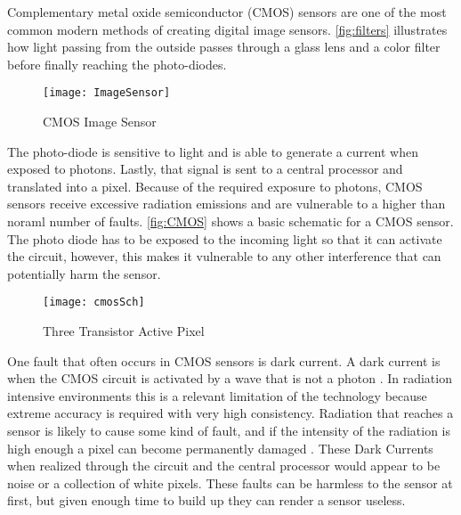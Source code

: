 \par Complementary metal oxide semiconductor (CMOS) sensors are one of the most common modern methods of creating digital image sensors. \autoref{fig:filters} illustrates how light passing from the outside passes through a glass lens and a color filter before finally reaching the photo-diodes.
\begin{figure}[H]
    \texttt{[image: ImageSensor]}
    \caption{CMOS Image Sensor\cite{Tokyo_Electron_Committee}}
    \label{fig:filters}
\end{figure}
\par The photo-diode is sensitive to light and is able to generate a current when exposed to photons. Lastly, that signal is sent to a central processor and translated into a pixel\cite{Tokyo_Electron_Committee}. Because of the required exposure to photons, CMOS sensors receive excessive radiation emissions and are vulnerable to a higher than noraml number of faults. \autoref{fig:CMOS} shows a basic schematic for a CMOS sensor. The photo diode has to be exposed to the incoming light so that it can activate the circuit, however, this makes it vulnerable to any other interference that can potentially harm the sensor. 
\begin{figure}[H]
    \texttt{[image: cmosSch]}
    \caption{Three Transistor Active Pixel}
    \label{fig:CMOS}
\end{figure}
\par One fault that often occurs in CMOS sensors is dark current. A dark current is when the CMOS circuit is activated by a wave that is not a photon \cite{mcgrath_tobin_goiffon_magan_2018}. In radiation intensive environments this is a relevant limitation of the technology because extreme accuracy is required with very high consistency. Radiation that reaches a sensor is likely to cause some kind of fault, and if the intensity of the radiation is high enough a pixel can become permanently damaged \cite{bardoux_penquer_gilard_ecoffet_auvergne_2017}. These Dark Currents when realized through the circuit and the central processor would appear to be noise or a collection of white pixels. These faults can be harmless to the sensor at first, but given enough time to build up they can render a sensor useless. 